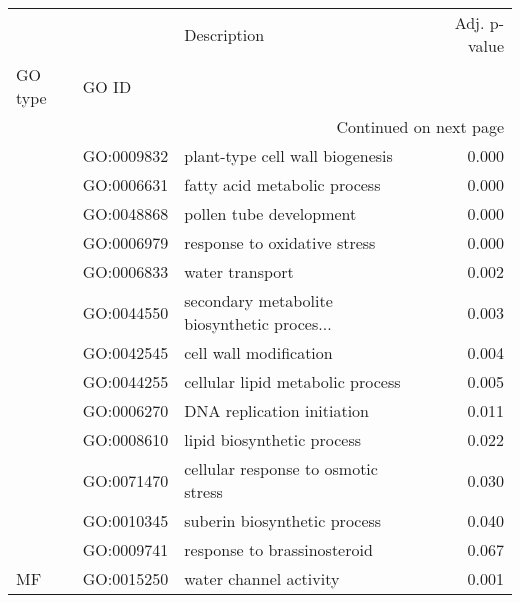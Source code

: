 \begin{longtable}{lllr}
\toprule
   &            &                                  Description &  Adj. p-value \\
GO type & GO ID &                                              &               \\
\midrule
\endhead
\midrule
\multicolumn{4}{r}{{Continued on next page}} \\
\midrule
\endfoot

\bottomrule
\endlastfoot
\multirow{13}{*}{BP} & GO:0009832 &              plant-type cell wall biogenesis &         0.000 \\
   & GO:0006631 &                 fatty acid metabolic process &         0.000 \\
   & GO:0048868 &                      pollen tube development &         0.000 \\
   & GO:0006979 &                 response to oxidative stress &         0.000 \\
   & GO:0006833 &                              water transport &         0.002 \\
   & GO:0044550 &  secondary metabolite biosynthetic proces... &         0.003 \\
   & GO:0042545 &                       cell wall modification &         0.004 \\
   & GO:0044255 &             cellular lipid metabolic process &         0.005 \\
   & GO:0006270 &                   DNA replication initiation &         0.011 \\
   & GO:0008610 &                   lipid biosynthetic process &         0.022 \\
   & GO:0071470 &          cellular response to osmotic stress &         0.030 \\
   & GO:0010345 &                 suberin biosynthetic process &         0.040 \\
   & GO:0009741 &                  response to brassinosteroid &         0.067 \\
\cline{1-4}
MF & GO:0015250 &                       water channel activity &         0.001 \\
\end{longtable}
